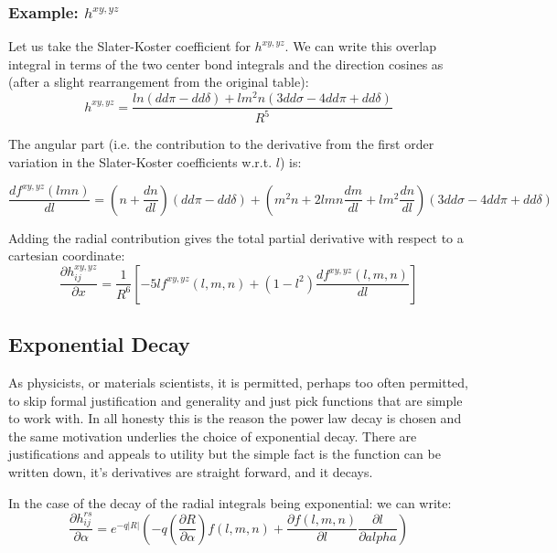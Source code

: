 \subsubsection{Example: $h^{xy,yz}$ }
Let us take the Slater-Koster coefficient for $h^{xy,yz}$. 
We can write this overlap integral in terms of the two center bond integrals 
and the direction cosines as (after a slight rearrangement from the original table):
% 
\begin{equation}
h^{xy,yz} = \frac{ln(dd\pi-dd\delta) + lm^{2}n (3dd\sigma-4dd\pi+dd\delta)}{R^5}
\end{equation}
%

The angular part (i.e. the contribution to the derivative from the first order variation in 
the Slater-Koster coefficients w.r.t. $l$) is:

\begin{equation}
\frac{d{f^{xy,yz}(lmn)}}{dl} = (n + \frac{dn}{dl})(dd\pi-dd\delta) 
                                                  + (m^{2}n +2lmn\frac{dm}{dl}+lm^{2}\frac{dn}{dl})(3dd\sigma-4dd\pi+dd\delta)
\end{equation}

Adding the radial contribution gives the total partial derivative with respect to a cartesian coordinate:
%
\begin{equation}
\frac{\partial h^{xy,yz}_{ij}}{\partial x} =  \frac{1}{R^{6}}[-5lf^{xy,yz}(l,m,n) + (1-l^{2})\frac{df^{xy,yz}(l,m,n)}{dl}]
\end{equation}
%

\subsection{Exponential Decay}
As physicists, or materials scientists, it is permitted, perhaps too often permitted, to skip formal
justification and generality and just pick functions that are simple to work with. In all honesty this
is the reason the power law decay is chosen and the same motivation underlies the choice of exponential
decay. There are justifications and appeals to utility but the simple fact is the function can be written
down, it's derivatives are straight forward, and it decays. 

In the case of the decay of the radial integrals being exponential:
we can write:
%
\begin{equation}
\frac{\partial h^{rs}_{ij}}{\partial \alpha} = e^{-q|R|}(-q(\frac{\partial R}{\partial \alpha})f(l,m,n) + 
\frac{\partial f(l,m,n)}{\partial l}\frac{\partial l}{\partial alpha})
\end{equation}

